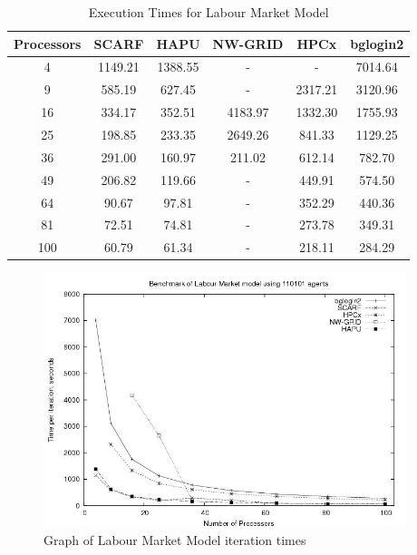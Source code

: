 {
\renewcommand{\arraystretch}{1.25}
\begin{table}[ht]
 \centering
  \begin{tabular}{c|ccccc}
 Processors &SCARF &HAPU  &NW-GRID &HPCx   &bglogin2 \\ \hline
4 &1149.21 &1388.55 &- &- &7014.64      \\
9 &585.19 &627.45 &- &2317.21 &3120.96  \\
16 &334.17 &352.51 &4183.97 &1332.30 &1755.93   \\
25 &198.85 &233.35 &2649.26 &841.33 &1129.25    \\
36 &291.00 &160.97 &211.02 &612.14 &782.70      \\
49 &206.82 &119.66 &- &449.91 &574.50   \\
64 &90.67 &97.81 &- &352.29 &440.36     \\
81 &72.51 &74.81 &- &273.78 &349.31     \\
100 &60.79 &61.34 &- &218.11 &284.29    \\

 \end{tabular}
 \caption{Execution Times for Labour Market Model}
 \label{tab:ExecutionTimesForLabour}
\end{table}
}
\bigskip
\begin{figure}[ht]
 \centering
  \includegraphics[width=300pt]{Labour2-graph.jpg}
 \caption{Graph of Labour Market Model iteration times}
 \label{fig:Labour-graph1}
\end{figure}

